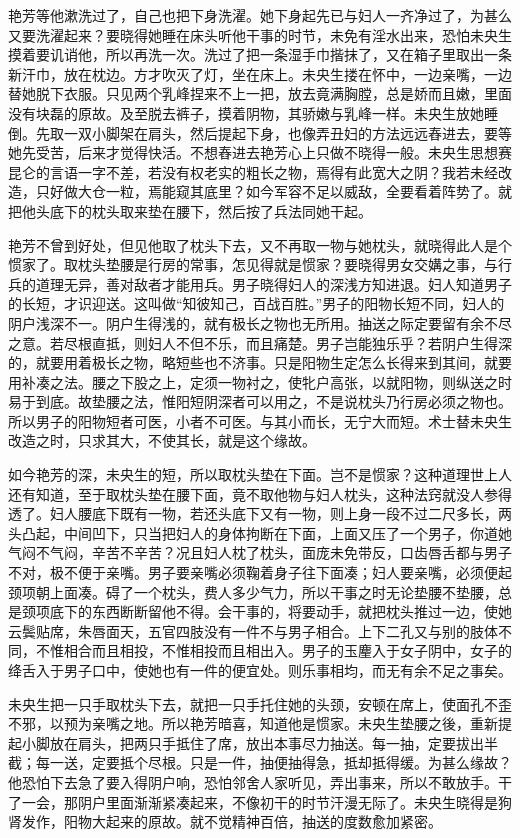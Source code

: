 \documentclass[a4paper,12pt,UTF8,twoside]{ctexbook}
\begin{document}
艳芳等他漱洗过了，自己也把下身洗濯。她下身起先已与妇人一齐净过了，为甚么又要洗濯起来？要晓得她睡在床头听他干事的时节，未免有淫水出来，恐怕未央生摸着要讥诮他，所以再洗一次。洗过了把一条湿手巾揩抹了，又在箱子里取出一条新汗巾，放在枕边。方才吹灭了灯，坐在床上。未央生搂在怀中，一边亲嘴，一边替她脱下衣服。只见两个乳峰捏来不上一把，放去竟满胸膛，总是娇而且嫩，里面没有块磊的原故。及至脱去裤子，摸着阴物，其骄嫩与乳峰一样。未央生放她睡倒。先取一双小脚架在肩头，然后提起下身，也像弄丑妇的方法远远舂进去，要等她先受苦，后来才觉得快活。不想舂进去艳芳心上只做不晓得一般。未央生思想赛昆仑的言语一字不差，若没有权老实的粗长之物，焉得有此宽大之阴？我若未经改造，只好做大仓一粒，焉能窥其底里？如今军容不足以威敌，全要看着阵势了。就把他头底下的枕头取来垫在腰下，然后按了兵法同她干起。

艳芳不曾到好处，但见他取了枕头下去，又不再取一物与她枕头，就晓得此人是个惯家了。取枕头垫腰是行房的常事，怎见得就是惯家？要晓得男女交媾之事，与行兵的道理无异，善对敌者才能用兵。男子晓得妇人的深浅方知进退。妇人知道男子的长短，才识迎送。这叫做“知彼知己，百战百胜。”男子的阳物长短不同，妇人的阴户浅深不一。阴户生得浅的，就有极长之物也无所用。抽送之际定要留有余不尽之意。若尽根直抵，则妇人不但不乐，而且痛楚。男子岂能独乐乎？若阴户生得深的，就要用着极长之物，略短些也不济事。只是阳物生定怎么长得来到其间，就要用补凑之法。腰之下股之上，定须一物衬之，使牝户高张，以就阳物，则纵送之时易于到底。故垫腰之法，惟阳短阴深者可以用之，不是说枕头乃行房必须之物也。所以男子的阳物短者可医，小者不可医。与其小而长，无宁大而短。术士替未央生改造之时，只求其大，不使其长，就是这个缘故。

如今艳芳的深，未央生的短，所以取枕头垫在下面。岂不是惯家？这种道理世上人还有知道，至于取枕头垫在腰下面，竟不取他物与妇人枕头，这种法窍就没人参得透了。妇人腰底下既有一物，若还头底下又有一物，则上身一段不过二尺多长，两头凸起，中间凹下，只当把妇人的身体拘断在下面，上面又压了一个男子，你道她气闷不气闷，辛苦不辛苦？况且妇人枕了枕头，面庞未免带反，口齿唇舌都与男子不对，极不便于亲嘴。男子要亲嘴必须鞠着身子往下面凑；妇人要亲嘴，必须便起颈项朝上面凑。碍了一个枕头，费人多少气力，所以干事之时无论垫腰不垫腰，总是颈项底下的东西断断留他不得。会干事的，将要动手，就把枕头推过一边，使她云鬓贴席，朱唇面天，五官四肢没有一件不与男子相合。上下二孔又与别的肢体不同，不惟相合而且相投，不惟相投而且相出入。男子的玉麈入于女子阴中，女子的绛舌入于男子口中，使她也有一件的便宜处。则乐事相均，而无有余不足之事矣。

未央生把一只手取枕头下去，就把一只手托住她的头颈，安顿在席上，使面孔不歪不邪，以预为亲嘴之地。所以艳芳暗喜，知道他是惯家。未央生垫腰之後，重新提起小脚放在肩头，把两只手抵住了席，放出本事尽力抽送。每一抽，定要拔出半截；每一送，定要抵个尽根。只是一件，抽便抽得急，抵却抵得缓。为甚么缘故？他恐怕下去急了要入得阴户响，恐怕邻舍人家听见，弄出事来，所以不敢放手。干了一会，那阴户里面渐渐紧凑起来，不像初干的时节汗漫无际了。未央生晓得是狗肾发作，阳物大起来的原故。就不觉精神百倍，抽送的度数愈加紧密。
\end{document}
